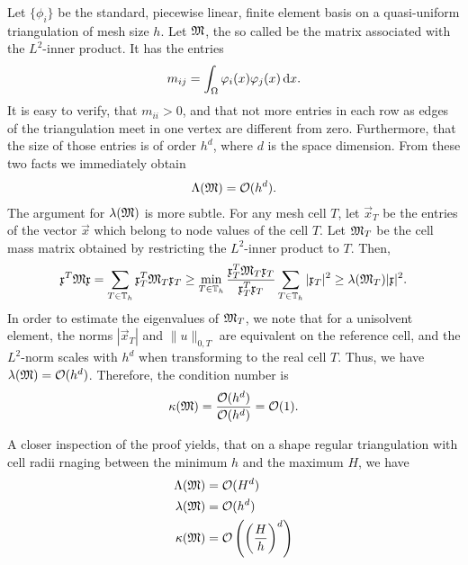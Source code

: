 \begin{example}
  Let $\{\phi_i\}$ be the standard, piecewise linear, finite element
  basis on a quasi-uniform triangulation of mesh size $h$. Let $\mathfrak{M}$, the so called  be the matrix associated with
  the $L^2$-inner product. It has the entries
  \begin{gather*}
    m_{ij} = \int_\Omega \varphi_i(x) \varphi_j(x) \,\mathrm{d} x.
  \end{gather*}
  It is easy to verify, that $m_{ii}> 0$, and that not more
  entries in each row as edges of the triangulation meet in one vertex
  are different from zero. Furthermore, that the size of those entries
  is of order $h^d$, where $d$ is the space dimension. From these two
  facts we immediately obtain
  \begin{gather*}
    \Lambda(\mathfrak{M}) = \mathcal O(h^{d}).
  \end{gather*}
  The argument for $\lambda(\mathfrak{M})$ is more subtle. For any mesh cell
  $T$, let $\vec x_T$ be the entries of the vector $\vec x$ which
  belong to node values of the cell $T$. Let $\mathfrak{M}_T$ be the cell
  mass matrix obtained by restricting the $L^2$-inner product to
  $T$. Then,
  \begin{gather*}
    \mathfrak{x}^T \mathfrak{M} \mathfrak{x}
    = \sum_{T\in\mathbb T_h} \mathfrak{x}^T_T \mathfrak{M}_T \mathfrak{x}_T
    \ge \min_{T\in\mathbb T_h} \frac{\mathfrak{x}^T_T \mathfrak{M}_T \mathfrak{x}_T}{\mathfrak{x}^T_T\mathfrak{x}_T}
    \sum_{T\in\mathbb T_h} |\mathfrak{x}_T|^2 \ge \lambda(\mathfrak{M}_T)  |\mathfrak{x}|^2.
  \end{gather*}
  In order to estimate the eigenvalues of $\mathfrak{M}_T$, we note that for
  a unisolvent element, the norms $|\vec x_T|$ and $\|u\|_{0,T}$ are
  equivalent on the reference cell, and the $L^2$-norm scales with
  $h^d$ when transforming to the real cell $T$. Thus, we have
  $\lambda(\mathfrak{M}) = \mathcal O(h^{d})$.
  Therefore, the condition number is
  \begin{gather*}
    \kappa(\mathfrak{M}) = \frac{\mathcal O(h^{d})}{\mathcal O(h^{d})} = {\mathcal O(1)}.
  \end{gather*}
\end{example}

\begin{note}
  A closer inspection of the proof yields, that on a shape regular
  triangulation with cell radii rnaging between the minimum $h$ and
  the maximum $H$, we have
  \begin{align*}
    \Lambda(\mathfrak{M}) &= \mathcal O(H^{d}) \\
    \lambda(\mathfrak{M}) &= \mathcal O(h^{d}) \\
    \kappa(\mathfrak{M}) &= \mathcal O\left(\left(\frac Hh\right)^{d}\right)
  \end{align*}
\end{note}


